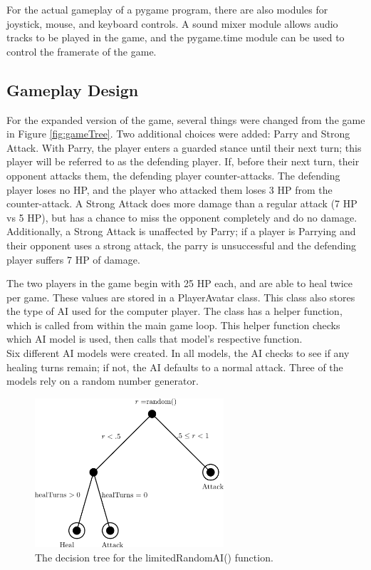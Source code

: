 For the actual gameplay of a pygame program, there are also modules for joystick, mouse, and keyboard controls. A sound mixer module allows audio tracks to be played in the game, and the pygame.time module can be used to control the framerate of the game.

\subsection{Gameplay Design}
For the expanded version of the game, several things were changed from the game in Figure \ref{fig:gameTree}. Two additional choices were added: Parry and Strong Attack. With Parry, the player enters a guarded stance until their next turn; this player will be referred to as the defending player. If, before their next turn, their opponent attacks them, the defending player counter-attacks. The defending player loses no HP, and the player who attacked them loses 3 HP from the counter-attack. A Strong Attack does more damage than a regular attack (7 HP vs 5 HP), but has a chance to miss the opponent completely and do no damage. Additionally, a Strong Attack is unaffected by Parry; if a player is Parrying and their opponent uses a strong attack, the parry is unsuccessful and the defending player suffers 7 HP of damage.

The two players in the game begin with 25 HP each, and are able to heal twice per game. These values are stored in a PlayerAvatar class. This class also stores the type of AI used for the computer player. The class has a helper function, which is called from within the main game loop. This helper function checks which AI model is used, then calls that model's respective function.\\

Six different AI models were created. In all models, the AI checks to see if any healing turns remain; if not, the AI defaults to a normal attack. Three of the models rely on a random number generator.\\

\begin{figure}[H]
  \centering
  \includegraphics[width=7cm]{figures/AILimitedRandom.png}
  \caption{The decision tree for the limitedRandomAI() function.}
  \label{fig:AI1}
\end{figure}

